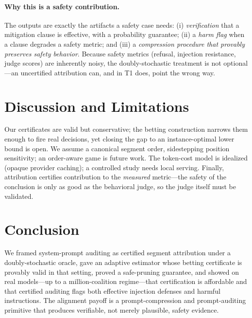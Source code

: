 \documentclass[10pt,twocolumn,letterpaper]{article}
\theoremstyle{plain}
\theoremstyle{definition}
\begin{document}
\paragraph{Why this is a safety contribution.} The outputs are exactly the
artifacts a safety case needs: (i) \emph{verification} that a mitigation clause
is effective, with a probability guarantee; (ii) a \emph{harm flag} when a clause
degrades a safety metric; and (iii) a \emph{compression procedure that provably
preserves safety behavior}. Because safety metrics (refusal, injection
resistance, judge scores) are inherently noisy, the doubly-stochastic treatment
is not optional---an uncertified attribution can, and in T1 does, point the wrong
way.

\section{Discussion and Limitations}

Our certificates are valid but conservative; the betting construction narrows
them enough to fire real decisions, yet closing the gap to an instance-optimal
lower bound is open. We assume a canonical segment order, sidestepping position
sensitivity; an order-aware game is future work. The token-cost model is
idealized (opaque provider caching); a controlled study needs local serving.
Finally, attribution certifies contribution to the \emph{measured} metric---the
safety of the conclusion is only as good as the behavioral judge, so the judge
itself must be validated.

\section{Conclusion}

We framed system-prompt auditing as certified segment attribution under a
doubly-stochastic oracle, gave an adaptive estimator whose betting certificate is
provably valid in that setting, proved a safe-pruning guarantee, and showed on
real models---up to a million-coalition regime---that certification is affordable
and that certified auditing flags both effective injection defenses and harmful
instructions. The alignment payoff is a prompt-compression and prompt-auditing
primitive that produces verifiable, not merely plausible, safety evidence.
\end{document}

